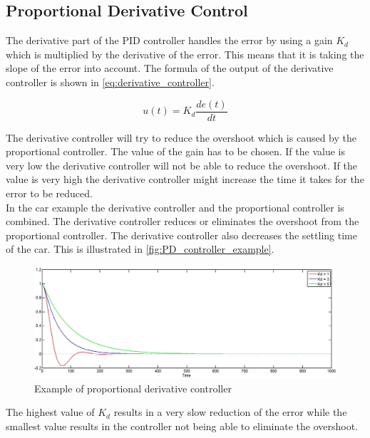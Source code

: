 
\subsection{Proportional Derivative Control} %
\label{sub:proportional_derivative_control}

The derivative part of the PID controller handles the error by using a gain $K_d$ which is multiplied by the derivative of the error. This means that it is taking the slope of the error into account. The formula of the output of the derivative controller is shown in \autoref{eq:derivative_controller}.

\begin{equation}
\label{eq:derivative_controller}
u(t)=K_d \frac{de(t)}{dt}
\end{equation}

The derivative controller will try to reduce the overshoot which is caused by the proportional controller. The value of the gain has to be chosen. If the value is very low the derivative controller will not be able to reduce the overshoot. If the value is very high the derivative controller might increase the time it takes for the error to be reduced.\\

In the car example the derivative controller and the proportional controller is combined. The derivative controller reduces or eliminates the overshoot from the proportional controller. The derivative controller also decreases the settling time of the car. This is illustrated in \autoref{fig:PD_controller_example}. \\

\begin{figure}[H]
\centering
\includegraphics[scale=0.35]{images/PDcontroller.jpg}
\caption{Example of proportional derivative controller}
\label{fig:PD_controller_example}
\end{figure}

The highest value of $K_d$ results in a very slow reduction of the error while the smallest value results in the controller not being able to eliminate the overshoot.

